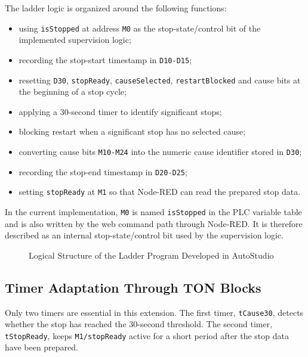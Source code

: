 The ladder logic is organized around the following functions:

\begin{itemize}[leftmargin=1.1cm]
  \item using \texttt{isStopped} at address \texttt{M0} as the stop-state/control bit of the implemented supervision logic;
  \item recording the stop-start timestamp in \texttt{D10-D15};
  \item resetting \texttt{D30}, \texttt{stopReady}, \texttt{causeSelected}, \texttt{restartBlocked} and cause bits at the beginning of a stop cycle;
  \item applying a 30-second timer to identify significant stops;
  \item blocking restart when a significant stop has no selected cause;
  \item converting cause bits \texttt{M10-M24} into the numeric cause identifier stored in \texttt{D30};
  \item recording the stop-end timestamp in \texttt{D20-D25};
  \item setting \texttt{stopReady} at \texttt{M1} so that Node-RED can read the prepared stop data.
\end{itemize}

In the current implementation, \texttt{M0} is named \texttt{isStopped} in the PLC variable table and is also written by the web command path through Node-RED. It is therefore described as an internal stop-state/control bit used by the supervision logic.

\begin{figure}[H]
\centering
{}
\caption{Logical Structure of the Ladder Program Developed in AutoStudio}
\label{fig:chapter4-3}
\end{figure}

\subsection{Timer Adaptation Through TON Blocks}
Only two timers are essential in this extension. The first timer, \texttt{tCause30}, detects whether the stop has reached the 30-second threshold. The second timer, \texttt{tStopReady}, keeps \texttt{M1/stopReady} active for a short period after the stop data have been prepared.

